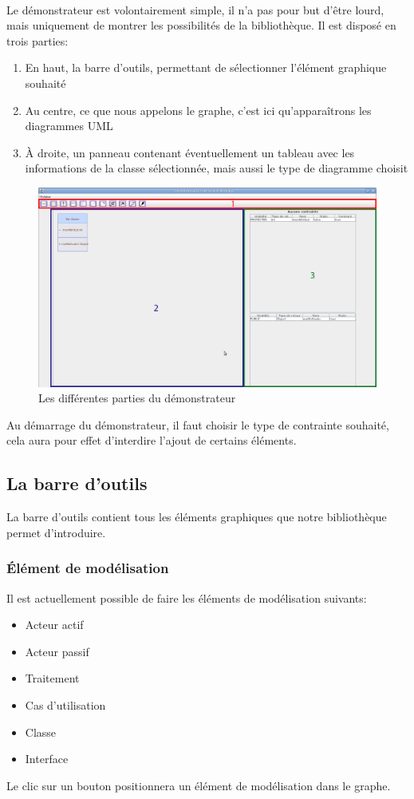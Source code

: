 \documentclass[12pt,a4paper,oneside]{book}
\begin{document}
	\paragraph{}	
	Le démonstrateur est volontairement simple, il n'a pas pour but d'être lourd, mais uniquement de montrer les possibilités de la bibliothèque. 
	Il est disposé en trois parties:
	\begin{enumerate}
		\item En haut, la barre d'outils, permettant de sélectionner l'élément graphique souhaité
		\item Au centre, ce que nous appelons le graphe, c'est ici qu'apparaîtrons les diagrammes UML
		\item À droite, un panneau contenant éventuellement un tableau avec les informations de la classe sélectionnée, mais aussi le type de diagramme choisit
	\end{enumerate}
	\begin{figure}[H]
		\centering
		\includegraphics[width=15cm]{screen1.jpg}
		\caption{Les différentes parties du démonstrateur}
	\end{figure}
	Au démarrage du démonstrateur, il faut choisir le type de contrainte souhaité, cela aura pour effet d'interdire l'ajout de certains éléments.
	\subsection{La barre d'outils}
	La barre d'outils contient tous les éléments graphiques que notre bibliothèque permet d'introduire.
	\subsubsection{Élément de modélisation}
	Il est actuellement possible de faire les éléments de modélisation suivants:
	\begin{itemize}
		\item Acteur actif
		\item Acteur passif
		\item Traitement
		\item Cas d'utilisation
		\item Classe
		\item Interface
	\end{itemize}
	Le clic sur un bouton positionnera un élément de modélisation dans le graphe.
\end{document}
